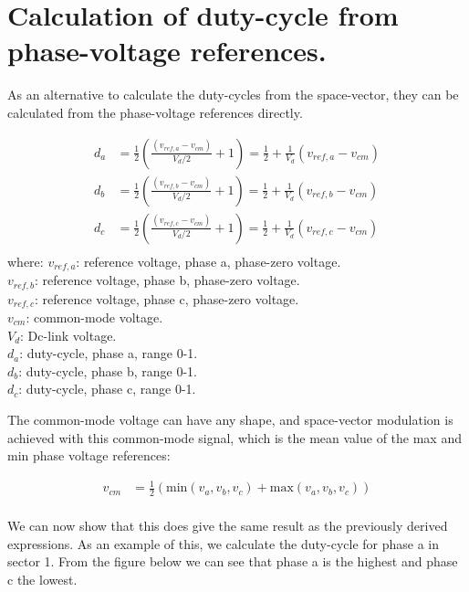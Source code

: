 \documentclass[]{book}
\begin{document}
\hypertarget{calculation-of-duty-cycle-from-phase-voltage-references.}{%
\section{Calculation of duty-cycle from phase-voltage references.}\label{calculation-of-duty-cycle-from-phase-voltage-references.}}

As an alternative to calculate the duty-cycles from the space-vector, they can be calculated from the phase-voltage references directly.

\[
\begin{aligned}
d_a  & = \frac{1}{2} \left( \frac{(v_{ref,a} - v_{cm})}{V_d/2} +1 \right) = \frac{1}{2} +\frac{1}{V_d}  (v_{ref,a} - v_{cm}) \\
d_b  & = \frac{1}{2} \left( \frac{(v_{ref,b} - v_{cm})}{V_d/2} +1 \right) = \frac{1}{2} +\frac{1}{V_d}  (v_{ref,b} - v_{cm}) \\
d_c  & = \frac{1}{2} \left( \frac{(v_{ref,c} - v_{cm})}{V_d/2} +1 \right) = \frac{1}{2} +\frac{1}{V_d}  (v_{ref,c} - v_{cm}) \\
\end{aligned}
\]
where:
\(v_{ref,a}\): reference voltage, phase a, phase-zero voltage.\\
\(v_{ref,b}\): reference voltage, phase b, phase-zero voltage.\\
\(v_{ref,c}\): reference voltage, phase c, phase-zero voltage.\\
\(v_{cm}\): common-mode voltage.\\
\(V_d\): Dc-link voltage.\\
\(d_a\): duty-cycle, phase a, range 0-1.\\
\(d_b\): duty-cycle, phase b, range 0-1.\\
\(d_c\): duty-cycle, phase c, range 0-1.

The common-mode voltage can have any shape, and space-vector modulation is achieved with this common-mode signal, which is the mean value of the max and min phase voltage references:

\[
\begin{aligned}
v_{cm}  &  = \frac{1}{2}  ( \text{min}(v_a, v_b, v_c) + \text{max}(v_a, v_b, v_c))\\
\end{aligned}
\]

We can now show that this does give the same result as the previously derived expressions. As an example of this, we calculate the duty-cycle for phase a in sector 1. From the figure below we can see that phase a is the highest and phase c the lowest.
\end{document}
